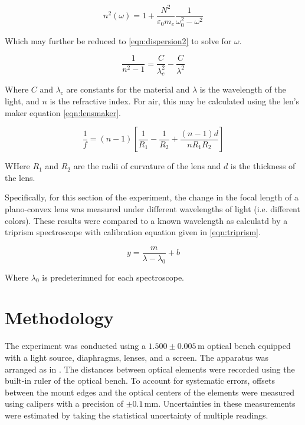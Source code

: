 \documentclass[aip, cp, amsmath, amssymb, reprint, nofootinbib]{revtex4-2}
\begin{document}
        \begin{equation} \label{eqn:dispersion}
            n^2(\omega) = 1 + \frac{N^2}{\varepsilon_0 m _e}\frac{1}{\omega_0^2 - \omega^2}
        \end{equation}

        Which may further be reduced \cite{labmanual} to \eqref{eqn:dispersion2} to solve for $\omega$.

        \begin{equation} \label{eqn:dispersion2}
            \frac{1}{n^2 - 1} = \frac{C}{\lambda_c^2} - \frac{C}{\lambda^2} 
        \end{equation}

        Where $C$ and $\lambda_c$ are constants for the material and $\lambda$ is the wavelength of the light, and $n$ is the refractive index. For air, this may be calculated using the len's maker equation \eqref{eqn:lensmaker}.

        \begin{equation} \label{eqn:lensmaker}
            \frac{1}{f} = (n-1)\left[\frac{1}{R_1} - \frac{1}{R_2} + \frac{(n-1)d}{n R_1 R_2}\right]
        \end{equation}

        WHere $R_1$ and $R_2$ are the radii of curvature of the lens and $d$ is the thickness of the lens. 

        Specifically, for this section of the experiment, the change in the focal length of a plano-convex lens was measured under different wavelengths of light (i.e. different colors). These results were compared to a known wavelength as calculatd by a triprism spectroscope with calibration equation given in \eqref{eqn:triprism}.

        \begin{equation} \label{eqn:triprism}
            y = \frac{m}{\lambda-\lambda_0} + b
        \end{equation}

        Where $\lambda_0$ is predeterimned for each spectroscope.


    \section{Methodology}

        The experiment was conducted using a $1.500\pm0.005\,\text{m}$ optical bench equipped with a light source, diaphragms, lenses, and a screen. The apparatus was arranged as in . The distances between optical elements were recorded using the built-in ruler of the optical bench. To account for systematic errors, offsets between the mount edges and the optical centers of the elements were measured using calipers with a precision of $\pm0.1\,\text{mm}$. Uncertainties in these measurements were estimated by taking the statistical uncertainty of multiple readings.
\end{document}
